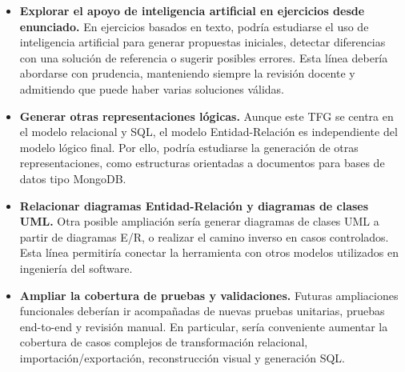 \begin{itemize}
    \item \textbf{Explorar el apoyo de inteligencia artificial en ejercicios desde enunciado.}  
    En ejercicios basados en texto, podría estudiarse el uso de inteligencia artificial para generar propuestas iniciales, detectar diferencias con una solución de referencia o sugerir posibles errores. Esta línea debería abordarse con prudencia, manteniendo siempre la revisión docente y admitiendo que puede haber varias soluciones válidas.

    \item \textbf{Generar otras representaciones lógicas.}  
    Aunque este TFG se centra en el modelo relacional y SQL, el modelo Entidad-Relación es independiente del modelo lógico final. Por ello, podría estudiarse la generación de otras representaciones, como estructuras orientadas a documentos para bases de datos tipo MongoDB.

    \item \textbf{Relacionar diagramas Entidad-Relación y diagramas de clases UML.}  
    Otra posible ampliación sería generar diagramas de clases UML a partir de diagramas E/R, o realizar el camino inverso en casos controlados. Esta línea permitiría conectar la herramienta con otros modelos utilizados en ingeniería del software.

    \item \textbf{Ampliar la cobertura de pruebas y validaciones.}  
    Futuras ampliaciones funcionales deberían ir acompañadas de nuevas pruebas unitarias, pruebas end-to-end y revisión manual. En particular, sería conveniente aumentar la cobertura de casos complejos de transformación relacional, importación/exportación, reconstrucción visual y generación SQL.
\end{itemize}